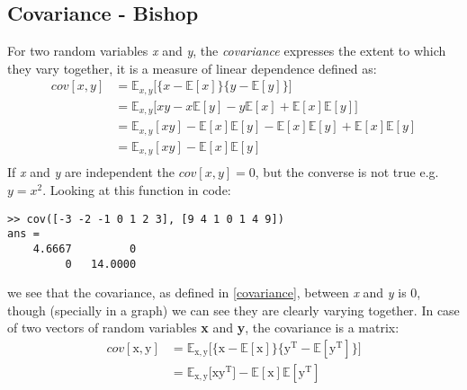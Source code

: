\subsection{Covariance - Bishop}
For two random variables \textit{x} and \textit{y}, the \textit{covariance} expresses the extent to which they vary together, it is a measure of linear dependence defined as:
\begin{align*}
cov[x,y] & = \mathbb{E}_{x,y}\big[\{x-\mathbb{E}[x]\}\{y-\mathbb{E}[y]\}\big] \\
& = \mathbb{E}_{x,y}\big[ xy - x\mathbb{E}[y] - y\mathbb{E}[x] + \mathbb{E}[x]\mathbb{E}[y] \big] \\
& = \mathbb{E}_{x,y}[xy] - \mathbb{E}[x]\mathbb{E}[y] - \mathbb{E}[x]\mathbb{E}[y] + \mathbb{E}[x]\mathbb{E}[y] \\
& = \mathbb{E}_{x,y}[xy] - \mathbb{E}[x]\mathbb{E}[y] \\
\end{align*}
If \textit{x} and \textit{y} are independent the $cov[x,y] = 0$, but the converse is not true e.g. $y=x^2$. Looking at this function in code:
\begin{verbatim}
>> cov([-3 -2 -1 0 1 2 3], [9 4 1 0 1 4 9])
ans =
    4.6667         0
         0   14.0000    
\end{verbatim}
we see that the covariance, as defined in \ref{covariance}, between \textit{x} and \textit{y} is 0, though (specially in a graph) we can see they are clearly varying together. In case of two vectors of random variables \textbf{x} and \textbf{y}, the covariance is a matrix:
\begin{align*}
cov[\boldsymbol{\mathrm{x}},\boldsymbol{\mathrm{y}}] & = \mathbb{E}_{\boldsymbol{\mathrm{x}},\boldsymbol{\mathrm{y}}}\big[\{\boldsymbol{\mathrm{x}}-\mathbb{E}[\boldsymbol{\mathrm{x}}]\}\{\boldsymbol{\mathrm{y}}^\mathrm{T}-\mathbb{E}[\boldsymbol{\mathrm{y}}^\mathrm{T}]\}\big] \\
& = \mathbb{E}_{\boldsymbol{\mathrm{x}},\boldsymbol{\mathrm{y}}}\big[ \boldsymbol{\mathrm{x}}\boldsymbol{\mathrm{y}}^\mathrm{T} \big] - \mathbb{E}[\boldsymbol{\mathrm{x}}] \mathbb{E}[\boldsymbol{\mathrm{y}}^\mathrm{T}]  
\end{align*}



